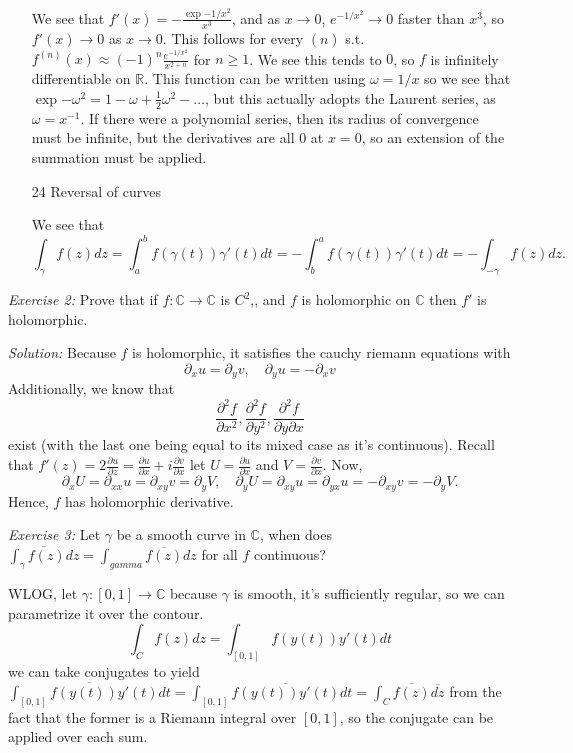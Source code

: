 \documentclass{article}
\newcommand{\exercise}[2]{
\vspace{0.2in}\begin{mdframed}[
  backgroundcolor=problem,
  skipabove=\topsep,
  skipbelow=\topsep
  ]
  \emph{Exercise {#1}:} {#2}
\end{mdframed}}
\newcommand{\R}{\mathbb{R}}
\newcommand{\C}{\mathbb{C}}
\begin{document}
\begin{enumerate}
      \item[] We see that $f'(x) = -\frac{\exp{-1/x^2}}{x^3}$, and as $x\to 0$, $e^{-1/x^2}\to 0$ faster than $x^3$, so $f'(x)\to 0$ as $x\to 0$. This follows for every $(n)$ s.t. $f^{(n)}(x)\approx (-1)^n\frac{e^{-1/x^2}}{x^{2+n}}$ for $n\ge 1$. We see this tends to $0$, so $f$ is infinitely differentiable on $\R$.
      This function can be written using $\omega = 1/x$ so we see that $\exp{-\omega^2} = 1 - \omega + \frac{1}{2}\omega^2 -\dots$, but this actually adopts the Laurent series, as $\omega = x^{-1}$. If there were a polynomial series, then its radius of convergence
      must be infinite, but the derivatives are all 0 at $x=0$, so an extension of the summation must be applied. 
      \item[24] Reversal of curves
      \item[] We see that
      \[\int_\gamma f(z)dz = \int_{a}^{b}f(\gamma(t))\gamma'(t)dt = -\int_{b}^af(\gamma(t))\gamma'(t)dt = -\int_{-\gamma}f(z)dz.\]  
    \end{enumerate}
    \exercise{2}{Prove that if $f:\C\to\C$ is $C^2$,, and $f$ is holomorphic on $\C$ then $f'$ is holomorphic.}
    \textit{Solution:} Because $f$ is holomorphic, it satisfies the 
    cauchy riemann equations with 
    \[\partial_x u = \partial_y v,\quad \partial_y u = -\partial_x v\] 
    Additionally, we know that 
    \[\frac{\partial^2 f}{\partial x^2},\frac{\partial^2 f}{\partial y^2}, \frac{\partial^2 f}{\partial y\partial x}\]
    exist (with the last one being equal to its mixed case as it's continuous).
    Recall that $f'(z) = 2\frac{\partial u}{\partial z} = \frac{\partial u}{\partial x} + i\frac{\partial v}{\partial x}$
    let $U = \frac{\partial u}{\partial x}$ and $V = \frac{\partial v}{\partial x}$. Now,
    \[ \partial_x U = \partial_{xx} u = \partial_{xy}v = \partial_{y}V,\quad \partial_y U = \partial_{xy} u = \partial_{yx}u = -\partial_{xy}v = -\partial_{y}V.\]
    Hence, $f$ has holomorphic derivative.
    \exercise{3}{Let $\gamma$ be a smooth curve in $\C$, when does $\overline{\int_{\gamma}f(z)dz} = \int_{gamma}\overline{f(z)}dz$ for all $f$ continuous?}
    WLOG, let $\gamma : [0,1] \to \C$ because $\gamma$ is smooth, it's sufficiently regular, so we can parametrize it over the contour.
    \[\int_C f(z)dz = \int_{[0,1]}f(y(t))y'(t)dt\]
    we can take conjugates to yield $\overline{\int_{[0,1]}f(y(t))y'(t)dt} = \int_{[0,1]}\overline{f(y(t))y'(t)}dt = \int_{C}\overline{f(z)}\overline{dz}$
    from the fact that the former is a Riemann integral over $[0,1]$, so the conjugate can be applied over each sum.\newline
\end{document}
